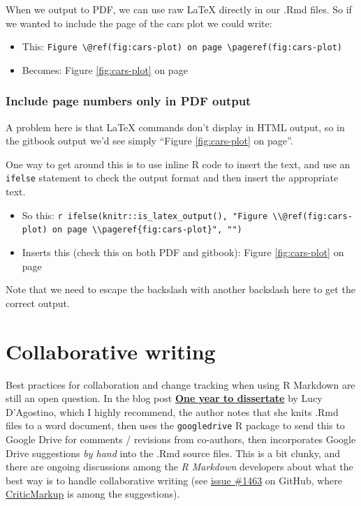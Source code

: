 \documentclass[a4paper, nobind]{templates/ociamthesis}
\providecommand{\tightlist}{%
  \setlength{\itemsep}{0pt}\setlength{\parskip}{0pt}}
\begin{document}
When we output to PDF, we can use raw LaTeX directly in our .Rmd files. So if we wanted to include the page of the cars plot we could write:

\begin{itemize}
\tightlist
\item
  This: \texttt{Figure\ \textbackslash{}@ref(fig:cars-plot)\ on\ page\ \textbackslash{}pageref(fig:cars-plot)}
\item
  Becomes: Figure \ref{fig:cars-plot} on page \pageref{fig:cars-plot}
\end{itemize}

\hypertarget{include-page-numbers-only-in-pdf-output}{%
\subsubsection{Include page numbers only in PDF output}\label{include-page-numbers-only-in-pdf-output}}

A problem here is that LaTeX commands don't display in HTML output, so in the gitbook output we'd see simply ``Figure \ref{fig:cars-plot} on page''.

One way to get around this is to use inline R code to insert the text, and use an \texttt{ifelse} statement to check the output format and then insert the appropriate text.

\begin{itemize}
\tightlist
\item
  So this: \texttt{\textasciigrave{}r\ ifelse(knitr::is\_latex\_output(),\ "Figure\ \textbackslash{}\textbackslash{}@ref(fig:cars-plot)\ on\ page\ \textbackslash{}\textbackslash{}pageref\{fig:cars-plot\}",\ "")\textasciigrave{}}
\item
  Inserts this (check this on both PDF and gitbook): Figure \ref{fig:cars-plot} on page \pageref{fig:cars-plot}
\end{itemize}

Note that we need to escape the backslash with another backslash here to get the correct output.

\hypertarget{collaborative-writing}{%
\section{Collaborative writing}\label{collaborative-writing}}

Best practices for collaboration and change tracking when using R Markdown are still an open question.
In the blog post \href{https://livefreeordichotomize.com/2018/09/14/one-year-to-dissertate/}{\textbf{One year to dissertate}} by Lucy D'Agostino, which I highly recommend, the author notes that she knits .Rmd files to a word document, then uses the \texttt{googledrive} R package to send this to Google Drive for comments / revisions from co-authors, then incorporates Google Drive suggestions \emph{by hand} into the .Rmd source files.
This is a bit clunky, and there are ongoing discussions among the \emph{R Markdown} developers about what the best way is to handle collaborative writing (see \href{https://github.com/rstudio/rmarkdown/issues/1463}{issue \#1463} on GitHub, where \href{http://criticmarkup.com}{CriticMarkup} is among the suggestions).
\end{document}
